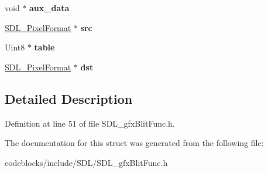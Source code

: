 \begin{DoxyCompactItemize}
\item 
\hypertarget{structSDL__gfxBlitInfo_adc4f6e914831474c0f9eb180f32bc8eb}{void $\ast$ {\bfseries aux\+\_\+data}}\label{structSDL__gfxBlitInfo_adc4f6e914831474c0f9eb180f32bc8eb}

\item 
\hypertarget{structSDL__gfxBlitInfo_a0af69b3969646f3b36d917ca8a6b63a0}{\hyperlink{structSDL__PixelFormat}{S\+D\+L\+\_\+\+Pixel\+Format} $\ast$ {\bfseries src}}\label{structSDL__gfxBlitInfo_a0af69b3969646f3b36d917ca8a6b63a0}

\item 
\hypertarget{structSDL__gfxBlitInfo_a0aef408dbc6b41b08be7044539d2ffcc}{Uint8 $\ast$ {\bfseries table}}\label{structSDL__gfxBlitInfo_a0aef408dbc6b41b08be7044539d2ffcc}

\item 
\hypertarget{structSDL__gfxBlitInfo_a74e16caa4cd190e63571ba59d63c535e}{\hyperlink{structSDL__PixelFormat}{S\+D\+L\+\_\+\+Pixel\+Format} $\ast$ {\bfseries dst}}\label{structSDL__gfxBlitInfo_a74e16caa4cd190e63571ba59d63c535e}

\end{DoxyCompactItemize}


\subsection{Detailed Description}


Definition at line 51 of file S\+D\+L\+\_\+gfx\+Blit\+Func.\+h.



The documentation for this struct was generated from the following file\+:\begin{DoxyCompactItemize}
\item 
codeblocks/include/\+S\+D\+L/S\+D\+L\+\_\+gfx\+Blit\+Func.\+h\end{DoxyCompactItemize}
